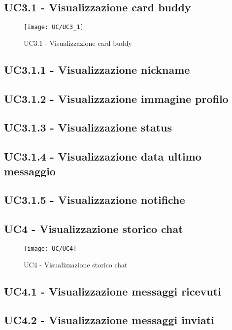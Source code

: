 \subsection{UC3.1 - Visualizzazione card buddy}
\begin{figure}[H] 
	\centering
	\texttt{[image: UC/UC3\_1]}
	\caption{UC3.1 - Visualizzazione card buddy}
\end{figure}

\subsection{UC3.1.1 - Visualizzazione nickname}

\subsection{UC3.1.2 - Visualizzazione immagine profilo}

\subsection{UC3.1.3 - Visualizzazione status}

\subsection{UC3.1.4 - Visualizzazione data ultimo messaggio}

\subsection{UC3.1.5 - Visualizzazione notifiche}


\subsection{UC4 - Visualizzazione storico chat}
\begin{figure}[H] 
	\centering
	\texttt{[image: UC/UC4]}
	\caption{UC4 - Visualizzazione storico chat}
\end{figure}


\subsection{UC4.1 - Visualizzazione messaggi ricevuti}

\subsection{UC4.2 - Visualizzazione messaggi inviati}



